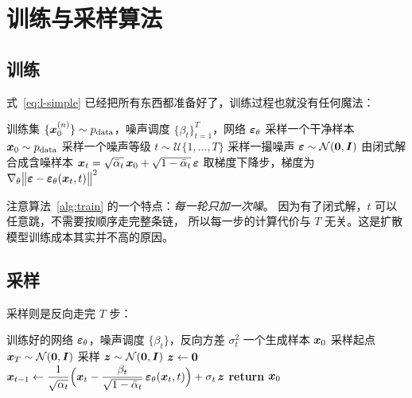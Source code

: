 \section{训练与采样算法}

\subsection{训练}

式~\eqref{eq:l-simple} 已经把所有东西都准备好了，训练过程也就没有任何魔法：

\begin{algorithm}[htbp]
  \caption{扩散模型的训练（对应式~\eqref{eq:l-simple}）}
  \label{alg:train}
  \begin{algorithmic}[1]
    \Require 训练集 $\{\bm{x}_0^{(n)}\}\sim p_{\text{data}}$，噪声调度 $\{\beta_t\}_{t=1}^{T}$，网络 $\bm{\varepsilon}_\theta$
    \Repeat
      \State 采样一个干净样本 $\bm{x}_0\sim p_{\text{data}}$
      \State 采样一个噪声等级 $t\sim\mathcal{U}\{1,\dots,T\}$
      \State 采样一撮噪声 $\bm{\varepsilon}\sim\mathcal{N}(\bm{0},\bm{I})$
      \State 由闭式解合成含噪样本
             $\bm{x}_t=\sqrt{\bar{\alpha}_t}\,\bm{x}_0+\sqrt{1-\bar{\alpha}_t}\,\bm{\varepsilon}$
      \State 取梯度下降步，梯度为
             $\nabla_\theta\bigl\|\bm{\varepsilon}-\bm{\varepsilon}_\theta(\bm{x}_t,t)\bigr\|^2$
  \end{algorithmic}
\end{algorithm}

注意算法~\ref{alg:train} 的一个特点：\emph{每一轮只加一次噪}。
因为有了闭式解，$t$ 可以任意跳，不需要按顺序走完整条链，
所以每一步的计算代价与 $T$ 无关。这是扩散模型训练成本其实并不高的原因。

\subsection{采样}

采样则是反向走完 $T$ 步：

\begin{algorithm}[htbp]
  \caption{扩散模型的采样（DDPM，$T$ 步）}
  \label{alg:sample}
  \begin{algorithmic}[1]
    \Require 训练好的网络 $\bm{\varepsilon}_\theta$，噪声调度 $\{\beta_t\}$，反向方差 $\sigma_t^2$
    \Ensure 一个生成样本 $\bm{x}_0$
    \State 采样起点 $\bm{x}_T\sim\mathcal{N}(\bm{0},\bm{I})$
        \State 采样 $\bm{z}\sim\mathcal{N}(\bm{0},\bm{I})$
      \Else
        \State $\bm{z}\gets\bm{0}$
      \EndIf
      \State $\bm{x}_{t-1}\gets\dfrac{1}{\sqrt{\alpha_t}}
             \Bigl(\bm{x}_t-\dfrac{\beta_t}{\sqrt{1-\bar{\alpha}_t}}\,\bm{\varepsilon}_\theta(\bm{x}_t,t)\Bigr)
             +\sigma_t\,\bm{z}$
    \EndFor
    \State \textbf{return} $\bm{x}_0$
  \end{algorithmic}
\end{algorithm}

